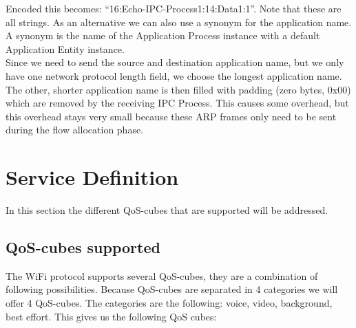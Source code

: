 \npar

Encoded this becomes: ``16:Echo-IPC-Process1:14:Data1:1''. Note that these are all strings. As an alternative we can also use a synonym for the application name. A synonym is the name of the Application Process instance with a default Application Entity instance. 
\\
Since we need to send the source and destination application name, but we only have one network protocol length field, we choose the longest application name. The other, shorter application name is then filled with padding (zero bytes, 0x00) which are removed by the receiving IPC Process. This causes some overhead, but this overhead stays very small because these ARP frames only need to be sent during the flow allocation phase.


\section{Service Definition}

In this section the different QoS-cubes that are supported will be addressed.

\subsection{QoS-cubes supported}

The WiFi protocol supports several QoS-cubes, they are a combination of following possibilities. 
\npar
Because QoS-cubes are separated in 4 categories we will offer 4 QoS-cubes. The categories are the following: voice, video, background, best effort. This gives us the following QoS cubes:

